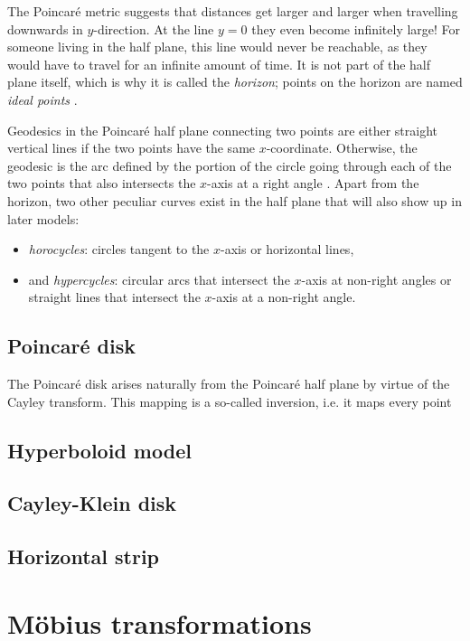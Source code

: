 The Poincaré metric suggests that distances get larger and larger when travelling downwards in \(y\)-direction. At the line \(y=0\) they even become infinitely large! For someone living in the half plane, this line would never be reachable, as they would have to travel for an infinite amount of time. It is not part of the half plane itself, which is why it is called the \emph{horizon}; points on the horizon are named \emph{ideal points} \cite{Needham1997}.

Geodesics in the Poincaré half plane connecting two points are either straight vertical lines if the two points have the same \(x\)-coordinate. Otherwise, the geodesic is the arc defined by the portion of the circle going through each of the two points that also intersects the \(x\)-axis at a right angle \cite{Ramsay1995}. Apart from the horizon, two other peculiar curves exist in the half plane that will also show up in later models:
\begin{itemize}
    \item \emph{horocycles}: circles tangent to the \(x\)-axis or horizontal lines,
    \item and \emph{hypercycles}: circular arcs that intersect the \(x\)-axis at non-right angles or straight lines that intersect the \(x\)-axis at a non-right angle. 
\end{itemize}


\subsection{Poincaré disk}
The Poincaré disk arises naturally from the Poincaré half plane by virtue of the Cayley transform. This mapping is a so-called inversion, i.e. it maps every point

\subsection{Hyperboloid model}
\subsection{Cayley-Klein disk}
\subsection{Horizontal strip}

\section{Möbius transformations}
